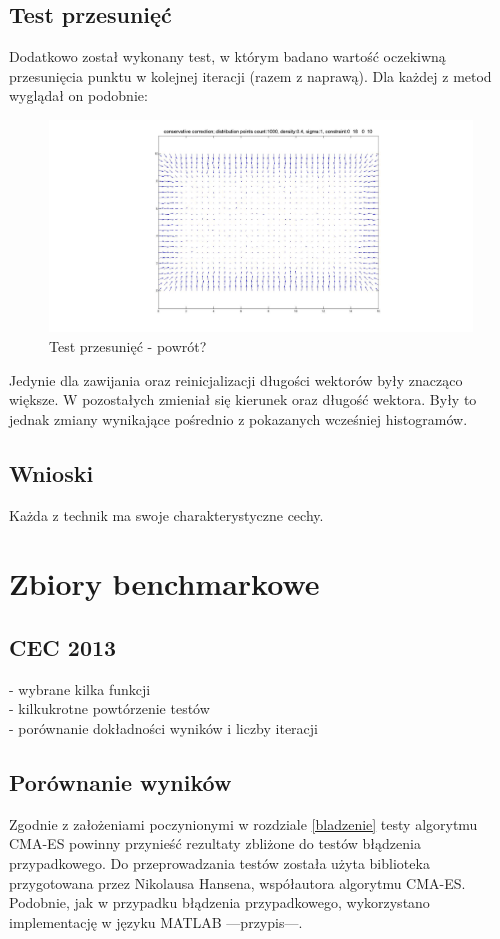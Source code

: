\documentclass{mini}
\begin{document}
\subsection{Test przesunięć}
Dodatkowo został wykonany test, w którym badano wartość oczekiwną przesunięcia punktu w kolejnej iteracji (razem z naprawą). Dla każdej z metod wyglądał on podobnie:

\begin{figure}[H]
\centering
\includegraphics[width=\textwidth]{conservative2dprzesuniecie}
\caption{Test przesunięć - powrót?}
\end{figure}

Jedynie dla zawijania oraz reinicjalizacji długości wektorów były znacząco większe. W pozostałych zmieniał się kierunek oraz długość wektora. Były to jednak zmiany wynikające pośrednio z pokazanych wcześniej histogramów.

\subsection{Wnioski}
Każda z technik ma swoje charakterystyczne cechy. 

\pagebreak

\section{Zbiory benchmarkowe}

\subsection{CEC 2013}
- wybrane kilka funkcji\\
- kilkukrotne powtórzenie testów\\
- porównanie dokładności wyników i liczby iteracji

\subsection{Porównanie wyników}
Zgodnie z założeniami poczynionymi w rozdziale \ref{bladzenie} testy algorytmu CMA-ES powinny przynieść rezultaty zbliżone do testów błądzenia przypadkowego. Do przeprowadzania testów została użyta biblioteka przygotowana przez Nikolausa Hansena, współautora algorytmu CMA-ES. Podobnie, jak w przypadku błądzenia przypadkowego, wykorzystano implementację w języku MATLAB ---przypis---.
\end{document}
